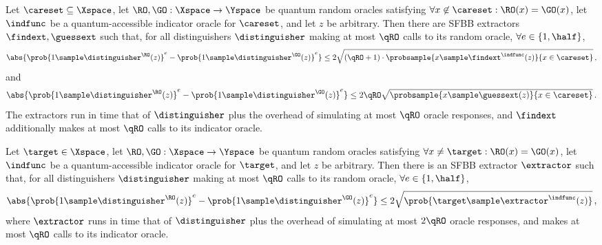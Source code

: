     \begin{lemma}
      Let $\careset \subseteq \Xspace$, let $\RO, \GO: \Xspace \to \Yspace$
      be quantum random oracles satisfying $\forall x \not\in \careset: \RO(x) =
      \GO(x)$, let $\indfunc$ be a quantum-accessible indicator oracle for $\careset$, and let $z$ be arbitrary. Then 
      there are SFBB extractors $\findext, \guessext$ such that, for all distinguishers
      $\distinguisher$ making at most $\qRO$ calls to its random oracle,
      $\forall e \in \{1, \half\}$,
      \[
        \abs{
          \prob{1 \sample \distinguisher^{\RO}(z)}^e - \prob{1 \sample \distinguisher^{\GO}(z)}^e
        } \leq 2 \sqrt{
          (\qRO + 1) \cdot \probsample{x \sample \findext^{\indfunc}(z)}{x \in \careset}
        }\, ,
      \]
      and
      \[
        \abs{
          \prob{1 \sample \distinguisher^{\RO}(z)}^e - \prob{1 \sample \distinguisher^{\GO}(z)}^e
        } \leq 2 \qRO \sqrt{
          \probsample{x \sample \guessext(z)}{x \in \careset}
        }\, .
      \]
      The extractors run in time that of $\distinguisher$ plus the
      overhead of simulating at most $\qRO$ oracle responses, and
      $\findext$ additionally makes at most $\qRO$ calls to its
      indicator oracle.
    \end{lemma}

    \begin{lemma}
      Let $\target \in \Xspace$, let $\RO, \GO: \Xspace \to \Yspace$
      be quantum random oracles satisfying $\forall x \neq \target: \RO(x) =
      \GO(x)$, let $\indfunc$ be a quantum-accessible indicator oracle for $\target$, and let $z$ be arbitrary. Then 
      there is an SFBB extractor $\extractor$ such that, for all distinguishers
      $\distinguisher$ making at most $\qRO$ calls to its random oracle, 
      $\forall e \in \{1, \half\}$,
      \[
        \abs{
          \prob{1 \sample \distinguisher^{\RO}(z)}^e - \prob{1 \sample \distinguisher^{\GO}(z)}^e
        } \leq 2 \sqrt{
          \prob{\target \sample \extractor^{\indfunc}(z)}
        }\, ,
      \]
      where $\extractor$ runs in time that of $\distinguisher$ plus the
      overhead of simulating at most $2\qRO$ oracle responses, and makes at most $\qRO$ calls to its
      indicator oracle.
    \end{lemma}

